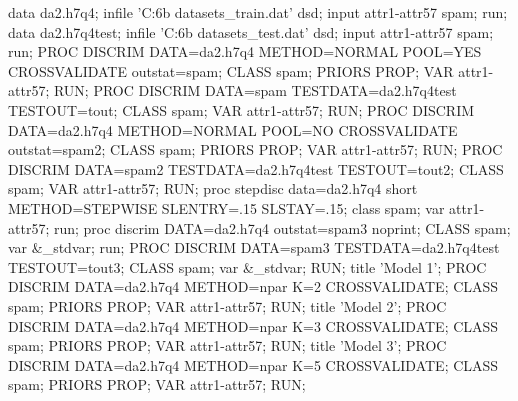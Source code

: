 \documentclass[letterpaper, 12pt]{article}
\begin{document}
\begin{Sascode}[store=class]
data da2.h7q4;
infile 'C:\Users\psy6b\Desktop{} datasets\spamdetect_train.dat' dsd;
input attr1-attr57 spam;
run;
data da2.h7q4test;
infile 'C:\Users\psy6b\Desktop{} datasets\spamdetect_test.dat' dsd;
input attr1-attr57 spam;
run;
PROC DISCRIM DATA=da2.h7q4 METHOD=NORMAL POOL=YES CROSSVALIDATE outstat=spam;
CLASS spam;
PRIORS PROP;
VAR attr1-attr57;
RUN;
PROC DISCRIM DATA=spam TESTDATA=da2.h7q4test TESTOUT=tout;
CLASS spam;
VAR attr1-attr57;
RUN;
PROC DISCRIM DATA=da2.h7q4 METHOD=NORMAL POOL=NO CROSSVALIDATE outstat=spam2;
CLASS spam;
PRIORS PROP;
VAR attr1-attr57;
RUN;
PROC DISCRIM DATA=spam2 TESTDATA=da2.h7q4test TESTOUT=tout2;
CLASS spam;
VAR attr1-attr57;
RUN;
proc stepdisc data=da2.h7q4 short METHOD=STEPWISE SLENTRY=.15 SLSTAY=.15;
class spam;
var attr1-attr57;
run;
proc discrim DATA=da2.h7q4 outstat=spam3 noprint;
CLASS spam;
var &_stdvar;
run;
PROC DISCRIM DATA=spam3 TESTDATA=da2.h7q4test TESTOUT=tout3;
CLASS spam;
var &_stdvar;
RUN;
title 'Model 1';
PROC DISCRIM DATA=da2.h7q4 METHOD=npar K=2 CROSSVALIDATE;
CLASS spam;
PRIORS PROP;
VAR attr1-attr57;
RUN;
title 'Model 2';
PROC DISCRIM DATA=da2.h7q4 METHOD=npar K=3 CROSSVALIDATE;
CLASS spam;
PRIORS PROP;
VAR attr1-attr57;
RUN;
title 'Model 3';
PROC DISCRIM DATA=da2.h7q4 METHOD=npar K=5 CROSSVALIDATE;
CLASS spam;
PRIORS PROP;
VAR attr1-attr57;
RUN;




\end{Sascode}



\end{document}
